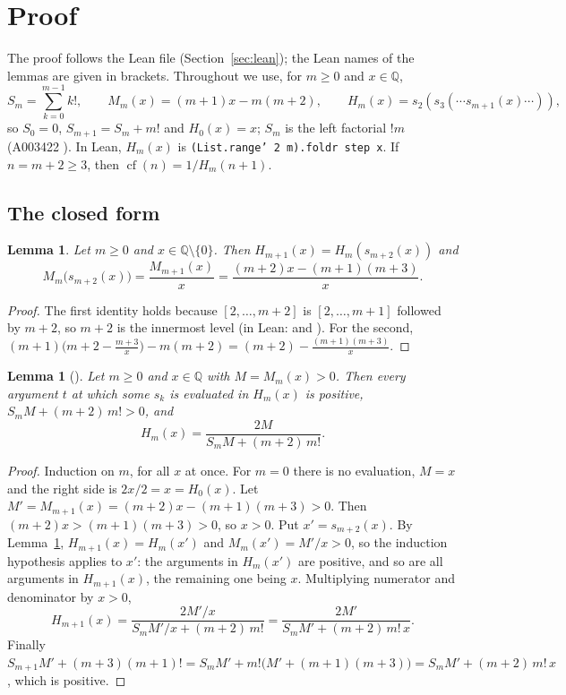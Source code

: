 \documentclass[11pt]{amsart}
\theoremstyle{plain}
\newtheorem{lemma}[theorem]{Lemma}
\theoremstyle{definition}
\newcommand{\Q}{\mathbb{Q}}
\DeclareMathOperator{\cf}{cf}
\begin{document}
\section{Proof}\label{sec:proof}

The proof follows the Lean file  (Section~\ref{sec:lean}); the Lean names of the lemmas are given in brackets. Throughout we use, for $m\ge0$ and $x\in\Q$,
\[
  S_m=\sum_{k=0}^{m-1}k!,\qquad M_m(x)=(m+1)x-m(m+2),\qquad H_m(x)=s_2(s_3(\cdots s_{m+1}(x)\cdots)),
\]
so $S_0=0$, $S_{m+1}=S_m+m!$ and $H_0(x)=x$; $S_m$ is the left factorial $!m$ (A003422 \cite{A003422}). In Lean, $H_m(x)$ is \texttt{(List.range' 2 m).foldr step x}. If $n=m+2\ge3$, then $\cf(n)=1/H_m(n+1)$.

\subsection{The closed form}\label{sec:closed}

\begin{lemma}\label{lem:peel}
Let $m\ge0$ and $x\in\Q\setminus\{0\}$. Then $H_{m+1}(x)=H_m(s_{m+2}(x))$ and
\[
  M_m\bigl(s_{m+2}(x)\bigr)=\frac{M_{m+1}(x)}{x}=\frac{(m+2)x-(m+1)(m+3)}{x}.
\]
\end{lemma}

\begin{proof}
The first identity holds because $[2,\dots,m+2]$ is $[2,\dots,m+1]$ followed by $m+2$, so $m+2$ is the innermost level (in Lean:  and ). For the second,
$(m+1)\bigl(m+2-\tfrac{m+3}{x}\bigr)-m(m+2)=(m+2)-\tfrac{(m+1)(m+3)}{x}$.
\end{proof}

\begin{lemma}[]\label{lem:closed}
Let $m\ge0$ and $x\in\Q$ with $M=M_m(x)>0$. Then every argument $t$ at which some $s_k$ is evaluated in $H_m(x)$ is positive, $S_mM+(m+2)\,m!>0$, and
\[
  H_m(x)=\frac{2M}{S_m M+(m+2)\,m!}.
\]
\end{lemma}

\begin{proof}
Induction on $m$, for all $x$ at once. For $m=0$ there is no evaluation, $M=x$ and the right side is $2x/2=x=H_0(x)$.
Let $M'=M_{m+1}(x)=(m+2)x-(m+1)(m+3)>0$. Then $(m+2)x>(m+1)(m+3)>0$, so $x>0$. Put $x'=s_{m+2}(x)$. By Lemma~\ref{lem:peel}, $H_{m+1}(x)=H_m(x')$ and $M_m(x')=M'/x>0$, so the induction hypothesis applies to $x'$: the arguments in $H_m(x')$ are positive, and so are all arguments in $H_{m+1}(x)$, the remaining one being $x$. Multiplying numerator and denominator by $x>0$,
\[
  H_{m+1}(x)=\frac{2M'/x}{S_mM'/x+(m+2)\,m!}=\frac{2M'}{S_mM'+(m+2)\,m!\,x}.
\]
Finally $S_{m+1}M'+(m+3)(m+1)!=S_mM'+m!\bigl(M'+(m+1)(m+3)\bigr)=S_mM'+(m+2)\,m!\,x$, which is positive.
\end{proof}
\end{document}
